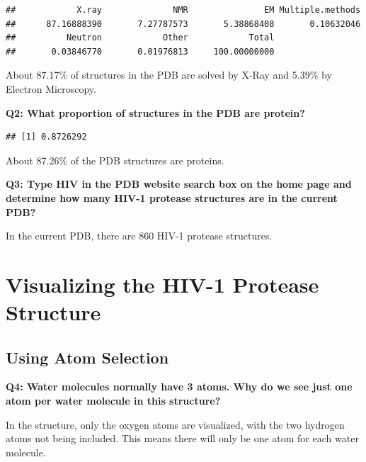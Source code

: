 \documentclass[
]{article}
\newenvironment{Shaded}{\begin{snugshade}}{\end{snugshade}}
\newcommand{\CommentTok}[1]{\textcolor[rgb]{0.56,0.35,0.01}{\textit{#1}}}
\newcommand{\DecValTok}[1]{\textcolor[rgb]{0.00,0.00,0.81}{#1}}
\newcommand{\FunctionTok}[1]{\textcolor[rgb]{0.00,0.00,0.00}{#1}}
\newcommand{\NormalTok}[1]{#1}
\newcommand{\SpecialCharTok}[1]{\textcolor[rgb]{0.00,0.00,0.00}{#1}}
\begin{document}
\begin{verbatim}
##            X.ray              NMR               EM Multiple.methods 
##      87.16888390       7.27787573       5.38868408       0.10632046 
##          Neutron            Other            Total 
##       0.03846770       0.01976813     100.00000000
\end{verbatim}

About 87.17\% of structures in the PDB are solved by X-Ray and 5.39\% by
Electron Microscopy.

\textbf{Q2: What proportion of structures in the PDB are protein?}

\begin{Shaded}
\end{Shaded}

\begin{verbatim}
## [1] 0.8726292
\end{verbatim}

About 87.26\% of the PDB structures are proteins.

\textbf{Q3: Type HIV in the PDB website search box on the home page and
determine how many HIV-1 protease structures are in the current PDB?}

In the current PDB, there are 860 HIV-1 protease structures.

\hypertarget{visualizing-the-hiv-1-protease-structure}{%
\section{Visualizing the HIV-1 Protease
Structure}\label{visualizing-the-hiv-1-protease-structure}}

\hypertarget{using-atom-selection}{%
\subsection{Using Atom Selection}\label{using-atom-selection}}

\textbf{Q4: Water molecules normally have 3 atoms. Why do we see just
one atom per water molecule in this structure?}

In the structure, only the oxygen atoms are visualized, with the two
hydrogen atoms not being included. This means there will only be one
atom for each water molecule.
\end{document}
